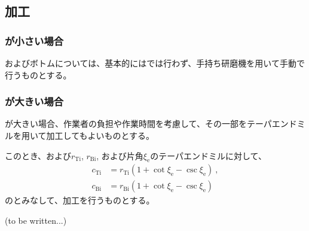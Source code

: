 \subsection{\EndFaceInRoundChamfer 加工}

\subsubsection{\EndFaceInRoundChamferRadius が小さい場合}
およびボトム\nameEndFaceInRoundChamfer については、基本的には\MMC では行わず、手持ち研磨機を用いて手動で行うものとする。

\subsubsection{\EndFaceInRoundChamferRadius が大きい場合}
\EndFaceInRoundChamferRadius が大きい場合、作業者の負担や作業時間を考慮して、その一部をテーパエンドミルを用いて加工してもよいものとする。

このとき、\TopEndFaceInRoundChamferRadius および\BottomFaceInRoundChamferRadius$r_\mathrm{Ti}$, $r_\mathrm{Bi}$, および片角$\xi_\mathrm e$のテーパエンドミルに対して、
\begin{align*}
  c_\mathrm{Ti} &= r_\mathrm{Ti}\left(1+\cot\xi_\mathrm e-\csc\xi_\mathrm e\right)\ ,\\
  c_\mathrm{Bi} &= r_\mathrm{Bi}\left(1+\cot\xi_\mathrm e-\csc\xi_\mathrm e\right)
\end{align*}
の\EndFaceChamferLength とみなして、\nameEndFaceInChamfer 加工を行うものとする。



\clearpage
(to be written...)



